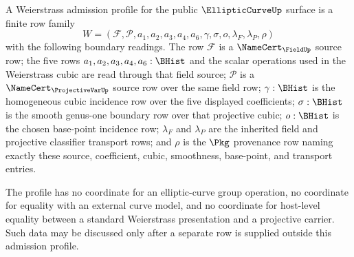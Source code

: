 \begin{definition}
\label{def:ellipticcurve-weierstrass-admission-profile}
A Weierstrass admission profile for the public $\EllipticCurveUp$ surface is a finite row family
$$
W=(\mathcal{F},\mathcal{P},a_1,a_2,a_3,a_4,a_6,\gamma,\sigma,o,\lambda_F,\lambda_P,\rho)
$$
with the following boundary readings. The row $\mathcal{F}$ is a $\NameCert_{\FieldUp}$ source row; the five rows $a_1,a_2,a_3,a_4,a_6:\BHist$ and the scalar operations used in the Weierstrass cubic are read through that field source; $\mathcal{P}$ is a $\NameCert_{\ProjectiveVarUp}$ source row over the same field row; $\gamma:\BHist$ is the homogeneous cubic incidence row over the five displayed coefficients; $\sigma:\BHist$ is the smooth genus-one boundary row over that projective cubic; $o:\BHist$ is the chosen base-point incidence row; $\lambda_F$ and $\lambda_P$ are the inherited field and projective classifier transport rows; and $\rho$ is the $\Pkg$ provenance row naming exactly these source, coefficient, cubic, smoothness, base-point, and transport entries.

The profile has no coordinate for an elliptic-curve group operation, no coordinate for equality with an external curve model, and no coordinate for host-level equality between a standard Weierstrass presentation and a projective carrier. Such data may be discussed only after a separate row is supplied outside this admission profile.
\end{definition}

